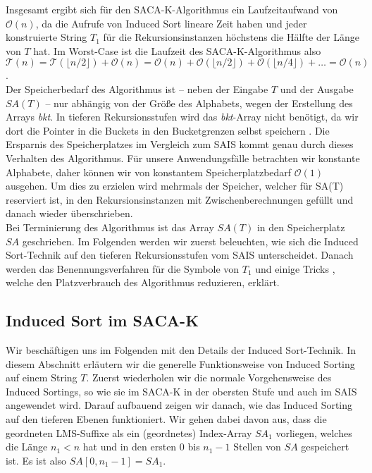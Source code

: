 Insgesamt ergibt sich für den SACA-K-Algorithmus ein Laufzeitaufwand von $\mathcal O(n)$, da die Aufrufe von Induced Sort lineare Zeit haben und jeder konstruierte String $T_1$ für die Rekursionsinstanzen höchstens die Hälfte der Länge von $T$ hat. Im Worst-Case ist die Laufzeit des SACA-K-Algorithmus also $\mathcal T(n) = \mathcal T(\lfloor n/2 \rfloor) + \mathcal O(n) = \mathcal O(n) + \mathcal O(\lfloor n/2 \rfloor) + \mathcal O(\lfloor n/4 \rfloor) + \ldots = \mathcal O(n)$. \\
Der Speicherbedarf des Algorithmus ist -- neben der Eingabe $T$ und der Ausgabe $SA(T)$ -- nur abhängig von der Größe des Alphabets, wegen der Erstellung des Arrays \textit{bkt}. In tieferen Rekursionsstufen wird das \textit{bkt}-Array nicht benötigt, da wir dort die Pointer in die Buckets in den Bucketgrenzen selbst speichern . Die Ersparnis des Speicherplatzes im Vergleich zum SAIS kommt genau durch dieses Verhalten des Algorithmus. Für unsere Anwendungsfälle betrachten wir konstante Alphabete, daher können wir von konstantem Speicherplatzbedarf $\mathcal O(1)$ ausgehen. Um dies zu erzielen wird mehrmals der Speicher, welcher für SA(T) reserviert ist, in den Rekursionsinstanzen mit Zwischenberechnungen gefüllt und danach wieder überschrieben.  \\

Bei Terminierung des Algorithmus ist das Array $SA(T)$ in den Speicherplatz $SA$ geschrieben. Im Folgenden werden wir zuerst beleuchten, wie sich die Induced Sort-Technik auf den tieferen Rekursionsstufen vom SAIS unterscheidet. Danach werden das Benennungsverfahren für die Symbole von $T_1$ und einige Tricks , welche den Platzverbrauch des Algorithmus reduzieren, erklärt.

\subsection{Induced Sort im SACA-K}

Wir beschäftigen uns im Folgenden mit den Details der Induced Sort-Technik. In diesem Abschnitt erläutern wir die generelle Funktionsweise von Induced Sorting auf einem String $T$. Zuerst wiederholen wir die normale Vorgehensweise des Induced Sortings, so wie sie im SACA-K in der obersten Stufe und auch im SAIS angewendet wird. Darauf aufbauend zeigen wir danach, wie das Induced Sorting auf den tieferen Ebenen funktioniert. Wir gehen dabei davon aus, dass die geordneten LMS-Suffixe als ein (geordnetes) Index-Array $SA_1$ vorliegen, welches die Länge $n_1 < n$ hat und in den ersten $0$ bis $n_1-1$ Stellen von $SA$ gespeichert ist. Es ist also $SA[0,n_1-1] = SA_1$. \pagebreak


